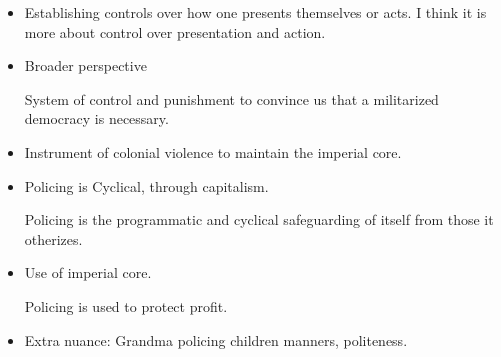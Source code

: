 \documentclass{report}
\begin{document}
\begin{description}
\begin{mdframed}
\begin{itemize}
                \item Establishing controls over how one presents themselves or acts.
                    I think it is more about control over presentation and action.

                \item Broader perspective

                    System of control and punishment to convince us that
                    a militarized democracy is necessary.

                \item Instrument of colonial violence to maintain the
                    imperial core.

                \item Policing is Cyclical, through capitalism. 

                    Policing is the programmatic and cyclical
                    safeguarding of itself from those it
                    otherizes.

                \item Use of imperial core.

                    Policing is used to protect profit.

                \item Extra nuance: Grandma policing children
                    manners, politeness.
            \end{itemize}
            
        \end{mdframed}
    \item {\large}
\end{description}
\end{document}
